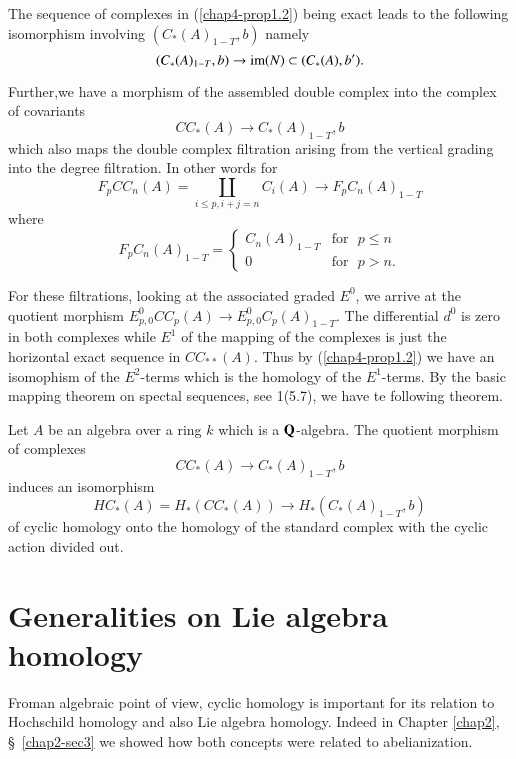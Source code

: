 \begin{remark}\label{chap4-rem1.3}
The sequence of complexes in (\ref{chap4-prop1.2}) being exact leads
to the following isomorphism involving $(C_{\ast}(A)_{1-T},b)$ namely
$$
(C_{\ast}(A)_{1-T},b)\to \operatorname{im} (N)\subset (C_{\ast}(A),b').
$$

Further,\pageoriginale we have a morphism of the assembled double
complex into the complex of covariants
$$
CC_{\ast}(A)\to C_{\ast}(A)_{1-T},b
$$
which also maps the double complex filtration arising from the
vertical grading into the degree filtration. In other words for
$$
F_{p}CC_{n}(A)=\coprod\limits_{i\leq p,i+j=n}C_{i}(A)\to
F_{p}C_{n}(A)_{1-T}
$$
where
$$
F_{p}C_{n}(A)_{1-T}=
\begin{cases}
C_{n}(A)_{1-T} & \text{for~ } p\leq n\\
0 & \text{for~ }p>n.
\end{cases}
$$

For these filtrations, looking at the associated graded $E^{0}$, we
arrive at the quotient morphism $E^{0}_{p,0}CC_{p}(A)\to
E^{0}_{p,0}C_{p}(A)_{1-T}$. The differential $d^{0}$ is zero in both
complexes while $E^{1}$ of the mapping of the complexes is just the
horizontal exact sequence in $CC_{\ast\ast}(A)$. Thus by
(\ref{chap4-prop1.2}) we have an isomophism of the $E^{2}$-terms which
is the homology of the $E^{1}$-terms. By the basic mapping theorem on
spectal sequences, see 1(5.7), we have te following theorem.
\end{remark}

\begin{theorem}\label{chap4-thm1.4}
Let $A$ be an algebra over a ring $k$ which is a $\mathbf{Q}$-algebra. The
quotient morphism of complexes
$$
CC_{\ast}(A)\to C_{\ast}(A)_{1-T},b
$$
induces an isomorphism
$$
HC_{\ast}(A)=H_{\ast}(CC_{\ast}(A))\to H_{\ast}(C_{\ast}(A)_{1-T},b)
$$
of cyclic homology onto the homology of the standard complex with the
cyclic action divided out.
\end{theorem}

\section{Generalities on Lie algebra
  homology}\label{chap4-sec2}

From\pageoriginale an algebraic point of view, cyclic homology is
important for its relation to Hochschild homology and also Lie algebra
homology. Indeed in Chapter \ref{chap2}, \S\ \ref{chap2-sec3} we
showed how both concepts were related to abelianization.

